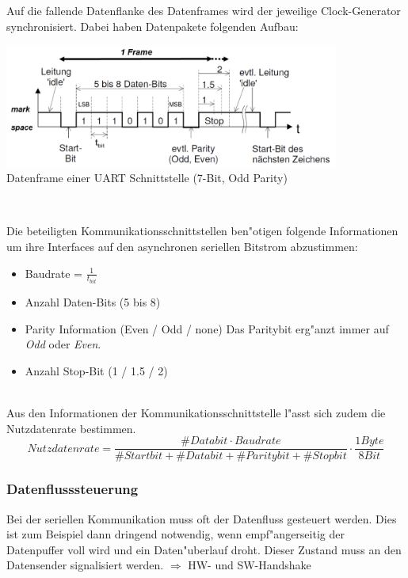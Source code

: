 Auf die fallende Datenflanke des Datenframes wird der jeweilige Clock-Generator synchronisiert. Dabei haben Datenpakete folgenden Aufbau:\\
	\begin{minipage}{11cm}
		\includegraphics[width=11cm]{images/datenframe-uart}\\
		Datenframe einer UART Schnittstelle (7-Bit, Odd Parity)
	\end{minipage}
	\begin{minipage}{0.5cm}
		\-\
	\end{minipage}
	\begin{minipage}{7cm}
		Die beteiligten Kommunikationsschnittstellen ben"otigen folgende Informationen um ihre Interfaces auf den asynchronen seriellen Bitstrom abzustimmen:
		\begin{itemize}
			\item Baudrate = $\frac{1}{t_{bit}}$
			\item Anzahl Daten-Bits (5 bis 8)
			\item Parity Information (Even / Odd / none) Das Paritybit erg"anzt immer auf \textit{Odd} oder \textit{Even}.
			\item Anzahl Stop-Bit (1 / 1.5 / 2)
		\end{itemize}
	\end{minipage}\\

Aus den Informationen der Kommunikationsschnittstelle l"asst sich zudem die Nutzdatenrate bestimmen.
	\begin{equation*}
		Nutzdatenrate = \frac{\#Databit \cdot Baudrate}{\#Startbit + \#Databit + \#Paritybit + \#Stopbit} \cdot \frac{1 Byte}{8 Bit}
	\end{equation*}
	
\newpage
\subsubsection{Datenflusssteuerung}
Bei der seriellen Kommunikation muss oft der Datenfluss gesteuert werden. Dies ist zum Beispiel dann dringend notwendig, wenn empf"angerseitig der Datenpuffer voll wird und ein Daten"uberlauf droht. Dieser Zustand muss an den Datensender signalisiert werden. $\Rightarrow$ HW- und SW-Handshake\\

